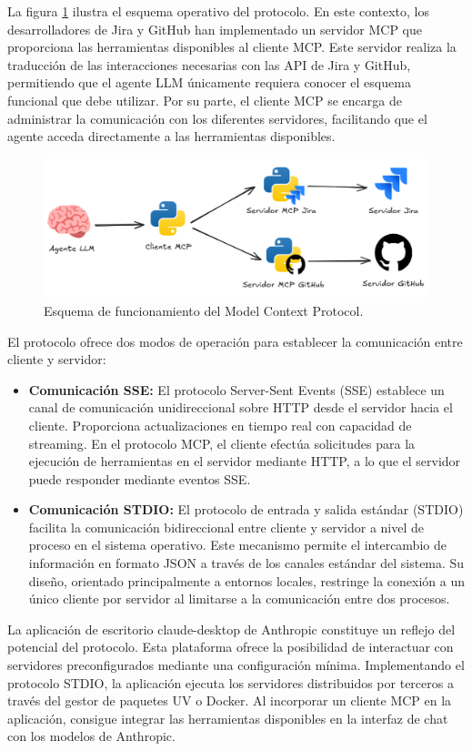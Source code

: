 La figura \ref{fig:mcp} ilustra el esquema operativo del protocolo. En este contexto, los desarrolladores de Jira y GitHub han implementado un servidor MCP que proporciona las herramientas disponibles al cliente MCP. Este servidor realiza la traducción de las interacciones necesarias con las API de Jira y GitHub, permitiendo que el agente LLM únicamente requiera conocer el esquema funcional que debe utilizar. Por su parte, el cliente MCP se encarga de administrar la comunicación con los diferentes servidores, facilitando que el agente acceda directamente a las herramientas disponibles.

\begin{figure}[H]
  \centering
  \includegraphics[width=1\linewidth]{figures/mcp.png}
  \caption{Esquema de funcionamiento del Model Context Protocol.}
  \label{fig:mcp}
\end{figure}


El protocolo ofrece dos modos de operación para establecer la comunicación entre cliente y servidor:
\begin{itemize}
  \item{\textbf{Comunicación SSE: } El protocolo Server-Sent Events (SSE) establece un canal de comunicación unidireccional sobre HTTP desde el servidor hacia el cliente. Proporciona actualizaciones en tiempo real con capacidad de streaming. En el protocolo MCP, el cliente efectúa solicitudes para la ejecución de herramientas en el servidor mediante HTTP, a lo que el servidor puede responder mediante eventos SSE.}
\item{\textbf{Comunicación STDIO: } El protocolo de entrada y salida estándar (STDIO) facilita la comunicación bidireccional entre cliente y servidor a nivel de proceso en el sistema operativo. Este mecanismo permite el intercambio de información en formato JSON a través de los canales estándar del sistema. Su diseño, orientado principalmente a entornos locales, restringe la conexión a un único cliente por servidor al limitarse a la comunicación entre dos procesos.}
\end{itemize}
La aplicación de escritorio claude-desktop de Anthropic constituye un reflejo del potencial del protocolo. Esta plataforma ofrece la posibilidad de interactuar con servidores preconfigurados mediante una configuración mínima. Implementando el protocolo STDIO, la aplicación ejecuta los servidores distribuidos por terceros a través del gestor de paquetes UV o Docker. Al incorporar un cliente MCP en la aplicación, consigue integrar las herramientas disponibles en la interfaz de chat con los modelos de Anthropic.

